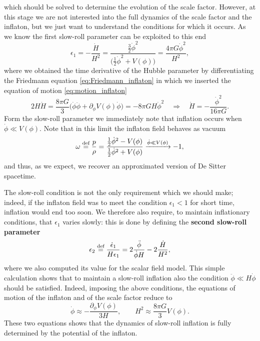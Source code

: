 which should be solved to determine the evolution of the scale factor. However, at this stage we are not interested into the full dynamics of the scale factor and the inflaton, but we just want to understand the conditions for which it occurs. As we know the first slow-roll parameter can be exploited to this end
\begin{equation}
    \epsilon_1=-\frac{\dot H}{H^2}=\frac{\frac{3}{2}\dot\phi^2}{\big(\frac{1}{2}\dot\phi^2+V(\phi)\big)}=\frac{4\pi G\dot\phi^2}{H^2},\label{eq:SRP_field}
\end{equation}
where we obtained the time derivative of the Hubble parameter by differentiating the Friedmann equation \eqref{eq:Friedmann_inflaton} in which we inserted the equation of motion \eqref{eq:motion_inflaton}
$$2H\dot H=\frac{8\pi G}{3}\bigg(\dot\phi\ddot\phi+\partial_\phi V(\phi)\dot\phi\bigg)=-8\pi GH\dot \phi^2\quad\Rightarrow\quad \dot H=-\frac{\dot \phi^2}{16\pi G}.$$
Form the slow-roll parameter we immediately note that inflation occurs when $\dot \phi\ll V(\phi)$. Note that in this limit the inflaton field behaves as vacuum $$\omega\stackrel{\text{def}}{=}\frac{p}{\rho}=\frac{\frac{1}{2}\dot\phi^2-V(\phi)}{\frac{1}{2}\dot\phi^2+V(\phi)}\xrightarrow{\dot\phi\ll V(\phi)}-1,$$
and thus, as we expect, we recover an approximated version of De Sitter spacetime.

The slow-roll condition is not the only requirement which we should make; indeed, if the inflaton field was to meet the condition $\epsilon_1<1$ for short time, inflation would end too soon. We therefore also require, to maintain inflationary conditions, that $\epsilon_1$ varies slowly: this is done by defining the \textbf{second slow-roll parameter}
\begin{equation}
    \epsilon_2\stackrel{\text{def}}{=}\frac{\dot\epsilon_1}{H\epsilon_1}=2\frac{\ddot\phi}{\dot\phi H}-2\frac{\dot H}{H^2},\label{eq:second_sr_parameter}
\end{equation}
where we also computed its value for the scalar field model. This simple calculation shows that to maintain a slow-roll inflation also the condition $\ddot\phi\ll H\dot\phi$ should be satisfied. Indeed, imposing the above conditions, the equations of motion of the inflaton and of the scale factor reduce to
\begin{equation}
    \label{eq:SR_equation_motion}
    \dot\phi \approx-\frac{\partial_\phi V(\phi)}{3H},\qquad H^2\approx\frac{8\pi G}{3}V(\phi).
\end{equation}
These two equations shows that the dynamics of slow-roll inflation is fully determined by the potential of the inflaton. 
